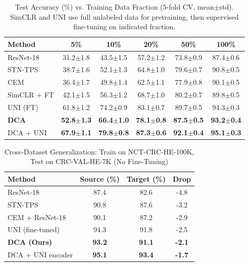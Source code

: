 \documentclass[pdflatex,sn-nature]{sn-jnl}%
\theoremstyle{thmstyleone}%
\theoremstyle{thmstyletwo}%
\theoremstyle{thmstylethree}%
\begin{document}
\begin{table}[t]
\centering
\caption{Test Accuracy (\%) vs. Training Data Fraction (5-fold CV, mean$\pm$std). SimCLR and UNI use full unlabeled data for pretraining, then supervised fine-tuning on indicated fraction.}
\label{tab:data_efficiency}
\begin{tabularx}{\textwidth}{Xccccc}
\hline
\textbf{Method} & \textbf{5\%} & \textbf{10\%} & \textbf{20\%} & \textbf{50\%} & \textbf{100\%} \\
\hline
ResNet-18 & 31.2$\pm$1.8 & 43.5$\pm$1.5 & 57.2$\pm$1.2 & 73.8$\pm$0.9 & 87.4$\pm$0.6 \\
STN-TPS & 38.7$\pm$1.6 & 52.1$\pm$1.3 & 64.8$\pm$1.0 & 79.6$\pm$0.7 & 90.8$\pm$0.5 \\
CEM & 36.4$\pm$1.7 & 49.8$\pm$1.4 & 62.5$\pm$1.1 & 77.9$\pm$0.8 & 90.1$\pm$0.5 \\
SimCLR + FT & 42.1$\pm$1.5 & 56.3$\pm$1.2 & 68.7$\pm$1.0 & 80.2$\pm$0.7 & 89.8$\pm$0.5 \\
UNI (FT) & 61.8$\pm$1.2 & 74.2$\pm$0.9 & 83.1$\pm$0.7 & 89.7$\pm$0.5 & 94.3$\pm$0.3 \\
\textbf{DCA} & \textbf{52.8$\pm$1.3} & \textbf{66.4$\pm$1.0} & \textbf{78.1$\pm$0.8} & \textbf{87.5$\pm$0.5} & \textbf{93.2$\pm$0.4} \\
DCA + UNI & \textbf{67.9$\pm$1.1} & \textbf{79.8$\pm$0.8} & \textbf{87.3$\pm$0.6} & \textbf{92.1$\pm$0.4} & \textbf{95.1$\pm$0.3} \\
\hline
\end{tabularx}
\end{table}
\begin{table}[t]
\centering
\caption{Cross-Dataset Generalization: Train on NCT-CRC-HE-100K, Test on CRC-VAL-HE-7K (No Fine-Tuning)}
\label{tab:generalization}
\begin{tabularx}{\textwidth}{Xccc}
\hline
\textbf{Method} & \textbf{Source (\%)} & \textbf{Target (\%)} & \textbf{Drop} \\
\hline
ResNet-18 & 87.4 & 82.6 & -4.8 \\
STN-TPS & 90.8 & 87.6 & -3.2 \\
CEM + ResNet-18 & 90.1 & 87.2 & -2.9 \\
UNI (fine-tuned) & 94.3 & 91.8 & -2.5 \\
\textbf{DCA (Ours)} & \textbf{93.2} & \textbf{91.1} & \textbf{-2.1} \\
DCA + UNI encoder & \textbf{95.1} & \textbf{93.4} & \textbf{-1.7} \\
\hline
\end{tabularx}
\end{table}
\end{document}
